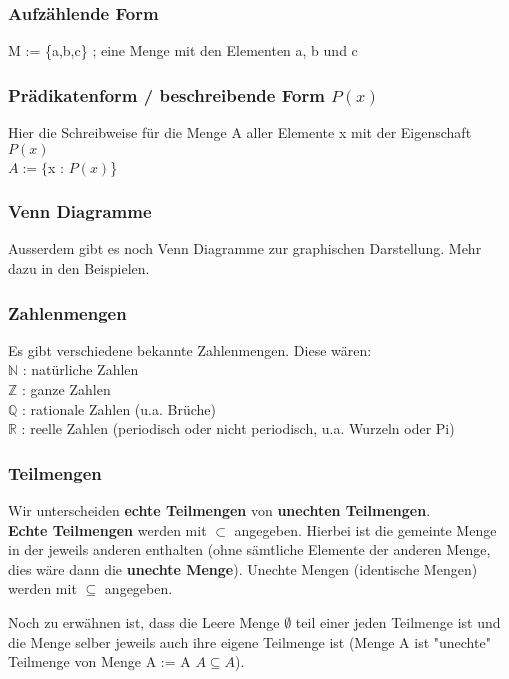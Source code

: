 \documentclass[a4paper,12pt]{article}
\begin{document}
\subsubsection{Aufzählende Form}
M := \{a,b,c\} ; eine Menge mit den Elementen a, b und c

\subsubsection{Prädikatenform / beschreibende Form \( P(x) \)}
Hier die Schreibweise für die Menge A aller Elemente x mit der Eigenschaft \( P(x) \) \\
$A := \{$x : \( P(x) \)\} \\

\subsubsection{Venn Diagramme}
Ausserdem gibt es noch Venn Diagramme zur graphischen Darstellung. Mehr dazu in den Beispielen.

\subsubsection{Zahlenmengen}
Es gibt verschiedene bekannte Zahlenmengen. Diese wären: \\
$\mathbb{N}$ : natürliche Zahlen \\
$\mathbb{Z}$ : ganze Zahlen \\
$\mathbb{Q}$ : rationale Zahlen (u.a. Brüche) \\
$\mathbb{R}$ : reelle Zahlen (periodisch oder nicht periodisch, u.a. Wurzeln oder Pi)

\subsubsection{Teilmengen}
Wir unterscheiden \textbf{echte Teilmengen} von \textbf{unechten Teilmengen}. \\
\textbf{Echte Teilmengen} werden mit $\subset$ angegeben. Hierbei ist die gemeinte Menge in der jeweils anderen enthalten (ohne \textnormal{sämtliche} Elemente der anderen Menge, dies \textnormal{wäre} dann die \textbf{unechte Menge}). Unechte Mengen (identische Mengen) werden mit $\subseteq$ angegeben.

Noch zu erwähnen ist, dass die Leere Menge $\emptyset$ teil einer jeden Teilmenge ist und die Menge selber jeweils auch ihre eigene Teilmenge ist (Menge A ist "unechte" Teilmenge von Menge A := A $A \subseteq A$).
\end{document}
